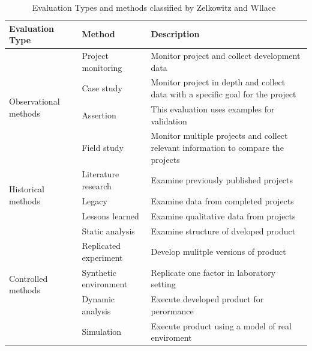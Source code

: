 \begin{table}[t]
  \centering
  \caption{Evaluation Types and methods classified by Zelkowitz and Wllace~\cite{Zelkowitz1998experimentalmodels}}
   \begin{tabular*}{.9\linewidth}{| p{.25\linewidth}| p{.2\linewidth} | p{.35\linewidth} |}
		\hline
			
    \textbf{Evaluation Type} & \textbf{Method} & \textbf{Description} \\\hline
			
    \multirow{4}[8]{*}{Observational methods} & Project monitoring & Monitor project and collect development data \\\cline{2-3}
          & Case study & Monitor project in depth and collect data with a specific goal for the project \\\cline{2-3}
          & Assertion & This evaluation uses examples for validation\\\cline{2-3}
          & Field study & Monitor multiple projects and collect relevant information to compare the projects \\\hline
    \multirow{3}[6]{*}{Historical methods} & Literature research & Examine previously published projects \\\cline{2-3}
          & Legacy & Examine data from completed projects \\\cline{2-3}
          & Lessons learned & Examine qualitative data from projects \\\hline
    \multirow{5}[10]{*}{Controlled methods} & Static analysis & Examine structure of dveloped product \\\cline{2-3}
          & Replicated experiment & Develop mulitple versions of product \\\cline{2-3}
          & Synthetic environment & Replicate one factor in laboratory setting \\\cline{2-3}
          & Dynamic analysis & Execute developed product for perormance \\\cline{2-3}
          & Simulation & Execute product using a model of real enviroment \\\hline
   
    \end{tabular*}%
  \label{tab:evaluationtypes}%
\end{table}%


